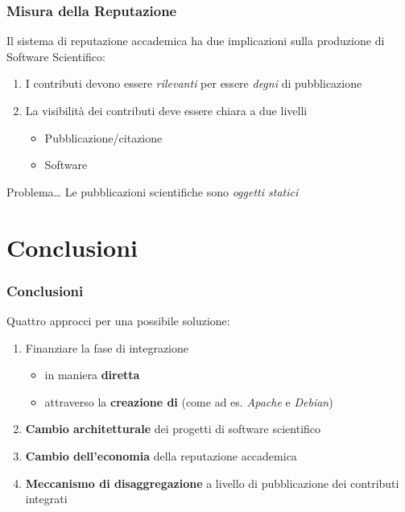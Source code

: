 \begin{frame}\frametitle{Misura della Reputazione}

Il sistema di reputazione accademica ha due implicazioni sulla
produzione di Software Scientifico:

\begin{enumerate}[<+->]
\def\labelenumi{\arabic{enumi}.}
\itemsep1pt\parskip0pt
\item
  I contributi devono essere \emph{rilevanti} per essere \emph{degni} di
  pubblicazione
\item
  La visibilità dei contributi deve essere chiara a due livelli

  \begin{itemize}[<+->]
  \itemsep1pt\parskip0pt
  \item
    Pubblicazione/citazione
  \item
    Software
  \end{itemize}
\end{enumerate}

\begin{alertblock}{Problema\dots}
Le pubblicazioni scientifiche sono \em{oggetti statici}
\end{alertblock}

\end{frame}

\section{Conclusioni}

\begin{frame}\frametitle{Conclusioni}

Quattro approcci per una possibile soluzione:

\begin{enumerate}[<+->]
\def\labelenumi{\arabic{enumi}.}
\itemsep1pt\parskip0pt
\item
  Finanziare la fase di integrazione

  \begin{itemize}[<+->]
  \itemsep1pt\parskip0pt
  \item
    in maniera \textbf{diretta}
  \item
    attraverso la \textbf{creazione di }
    (come ad es. \emph{Apache} e \emph{Debian})
  \end{itemize}
\item
  \textbf{Cambio architetturale} dei progetti di software scientifico
\item
  \textbf{Cambio dell'economia} della reputazione accademica
\item
  \textbf{Meccanismo di disaggregazione} a livello di pubblicazione dei
  contributi integrati
\end{enumerate}

\end{frame}
